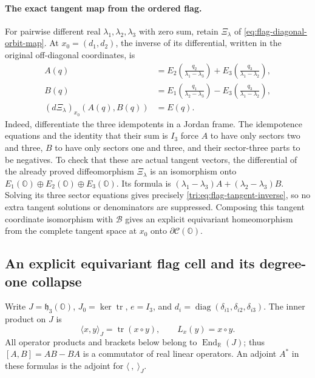 \documentclass[11pt]{article}
\theoremstyle{definition}
\begin{document}
\paragraph{The exact tangent map from the ordered flag.}
For pairwise different real \(\lambda_1,\lambda_2,\lambda_3\) with
zero sum, retain \(\Xi_\lambda\) of
\eqref{eq:flag-diagonal-orbit-map}. At \(x_0=(d_1,d_2)\), the inverse
of its differential, written in the original off-diagonal coordinates, is
\begin{equation}
 \begin{aligned}
 A(q)&=E_2\left(\frac{q_2}{\lambda_1-\lambda_3}\right)
       +E_3\left(\frac{q_3}{\lambda_1-\lambda_2}\right),\\
 B(q)&=E_1\left(\frac{q_1}{\lambda_2-\lambda_3}\right)
       -E_3\left(\frac{q_3}{\lambda_1-\lambda_2}\right),\\
 (d\Xi_\lambda)_{x_0}(A(q),B(q))&=E(q).
 \end{aligned}
 \label{tri:eq:flag-tangent-inverse}
\end{equation}
Indeed, differentiate the three idempotents in a Jordan frame. The
idempotence equations and the identity that their sum is \(I_3\)
force \(A\) to have only sectors two and three, \(B\) to have only
sectors one and three, and their sector-three parts to be negatives.
To check that these are actual tangent vectors, the differential of the
already proved diffeomorphism \(\Xi_\lambda\) is an isomorphism onto
\(E_1(\mathbb O)\oplus E_2(\mathbb O)\oplus E_3(\mathbb O)\).
Its formula is
\((\lambda_1-\lambda_3)A+(\lambda_2-\lambda_3)B\).
Solving its three sector equations gives precisely
\eqref{tri:eq:flag-tangent-inverse}, so no extra tangent solutions or
denominators are suppressed. Composing this tangent coordinate
isomorphism with \(\mathcal B\) gives an explicit equivariant
homeomorphism from the complete tangent space at \(x_0\) onto
\(\partial\mathcal C(\mathbb O)\).


\subsection{An explicit equivariant flag cell and its degree-one collapse}
\label{fc:section}

Write $J=\mathfrak h_3(\mathbb O)$, $J_0=\ker\operatorname{tr}$,
$e=I_3$, and $d_i=\operatorname{diag}(\delta_{i1},\delta_{i2},\delta_{i3})$.
The inner product on $J$ is
\[
 \langle x,y\rangle_J=\operatorname{tr}(x\circ y),\qquad
 L_x(y)=x\circ y.
\]
All operator products and brackets below belong to
$\operatorname{End}_{\mathbb R}(J)$; thus $[A,B]=AB-BA$ is a commutator
of real linear operators. An adjoint $A^*$ in these formulas is the
adjoint for $\langle\ ,\ \rangle_J$.
\end{document}
